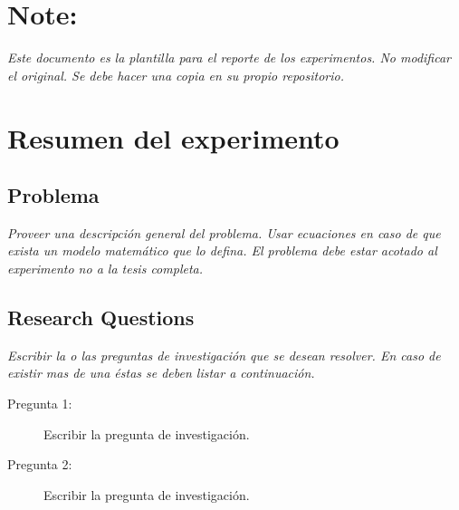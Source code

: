\documentclass[12pt,twoside,letterpaper]{article}
\begin{document}




\section*{Note:}
\emph{Este documento es la plantilla para el reporte de los experimentos. No modificar el original. Se debe hacer una copia en su propio repositorio.}

\section{Resumen del experimento}

\subsection{Problema}

\emph{Proveer una descripción general del problema. Usar ecuaciones en caso de que exista un modelo matemático que lo defina. El problema debe estar acotado al experimento no a la tesis completa.}


\subsection{Research Questions}

\emph{Escribir la o las preguntas de investigación que se desean resolver. En caso de existir mas de una éstas se deben listar a continuación.}

\begin{description}
\item [Pregunta 1:] Escribir la pregunta de investigación. 
\item [Pregunta 2:] Escribir la pregunta de investigación.
\end{description}

\end{document}
